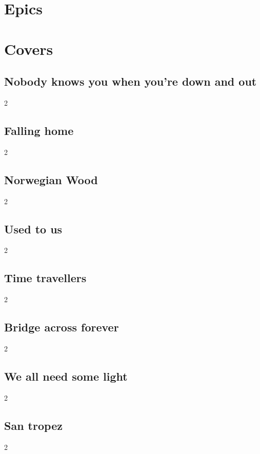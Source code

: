 \documentclass{article}
\newenvironment{album}[1]%
{%
  \section*{#1}
}%
{%
}
\newenvironment{song}[1]%
{%
  \subsection*{\textbf{#1}}
  \begin{multicols*}{2}
}%
{%
  \end{multicols*}
  \newpage
}
\begin{document}
\begin{album}{Epics}

\end{album}

\begin{album}{Covers}
\begin{song}{Nobody knows you when you're down and out}
\end{song}
\begin{song}{Falling home}  
\end{song}
\begin{song}{Norwegian Wood}
\end{song}
\begin{song}{Used to us}
\end{song}
\begin{song}{Time travellers}
\end{song}
\begin{song}{Bridge across forever}
\end{song}
\begin{song}{We all need some light}
\end{song}
\begin{song}{San tropez}
\end{song}
\end{album}
\end{document}
